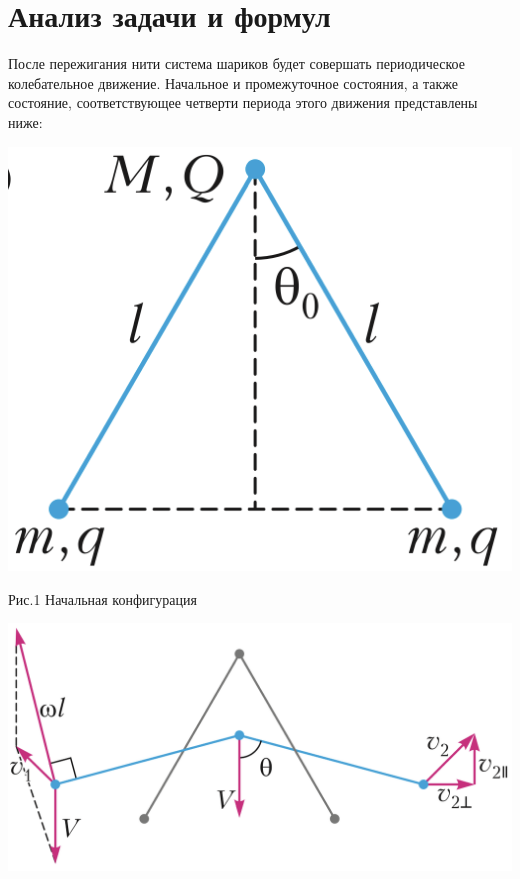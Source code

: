 \documentclass[landscape]{article}
\begin{document}
\section{Анализ задачи и формул}
После пережигания нити система шариков будет совершать периодическое колебательное движение. Начальное и промежуточное состояния, а также состояние, соответствующее четверти периода этого движения представлены ниже:
\begin{center}
    \begin{minipage}{.25\textwidth}
        \includegraphics[width=.9\textwidth]{triangle.png}\\
        \begin{center}
            Рис.1 Начальная конфигурация
        \end{center}
    \end{minipage}
    \hfill
    \begin{minipage}{.38\textwidth}
        \includegraphics[width=.9\textwidth]{pronKonf.png}\\
        \begin{center}

\end{center}
\end{minipage}
\end{center}
\end{document}
